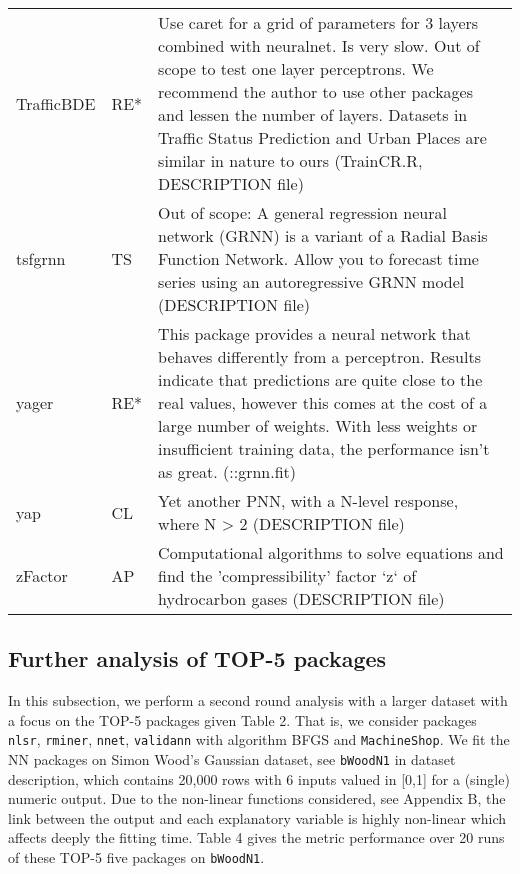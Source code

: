 \begin{Schunk}
\begin{longtable}[t]{ll>{\raggedright\arraybackslash}p{10cm}}
TrafficBDE & RE* & Use caret for a grid of parameters for 3 layers combined with neuralnet. Is very slow. Out of scope to test one layer perceptrons. We recommend the author to use other packages and lessen the number of layers. Datasets in Traffic Status Prediction and Urban Places are similar in nature to ours (TrainCR.R, DESCRIPTION file)\\
tsfgrnn & TS & Out of scope: A general regression neural network (GRNN) is a variant of a Radial Basis Function Network. Allow you to forecast time series using an autoregressive GRNN model (DESCRIPTION file)\\
\addlinespace
yager & RE* & This package provides a neural network that behaves differently from a perceptron. Results indicate that predictions are quite close to the real values, however this comes at the cost of a large number of weights. With less weights or insufficient training data, the performance isn't as great. (::grnn.fit)\\
yap & CL & Yet another PNN, with a N-level response, where N > 2 (DESCRIPTION file)\\
zFactor & AP & Computational algorithms to solve equations and find the 'compressibility' factor `z` of hydrocarbon gases (DESCRIPTION file)\\*
\end{longtable}
\endgroup{}

\end{Schunk}

\hypertarget{further-analysis-of-top-5-packages}{%
\subsection{Further analysis of TOP-5
packages}\label{further-analysis-of-top-5-packages}}

In this subsection, we perform a second round analysis with a larger
dataset with a focus on the TOP-5 packages given Table 2. That is, we
consider packages \texttt{nlsr}, \texttt{rminer}, \texttt{nnet},
\texttt{validann} with algorithm BFGS and \texttt{MachineShop}. We fit
the NN packages on Simon Wood's Gaussian dataset, see \texttt{bWoodN1}
in dataset description, which contains 20,000 rows with 6 inputs valued
in {[}0,1{]} for a (single) numeric output. Due to the non-linear
functions considered, see Appendix B, the link between the output and
each explanatory variable is highly non-linear which affects deeply the
fitting time. Table 4 gives the metric performance over 20 runs of these
TOP-5 five packages on \texttt{bWoodN1}.

